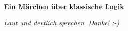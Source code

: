\documentclass[16pt]{scrartcl}
\begin{document}
\begin{center}
{\large \textbf{Ein Märchen über klassische Logik}}

\emph{Laut und deutlich sprechen. Danke! :-)}
\end{center}


\end{document}
